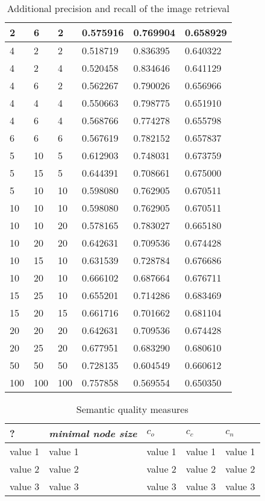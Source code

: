 \begin{table}[h]
    \begin{tabular}{| p{2cm}| p{2cm}| p{2cm} || p{2cm} | p{2cm} | p{2cm} |}
    \hline
    2	& 6	& 2	& 0.575916 & 0.769904 & 0.658929 \\ \hline    
    4	& 2	& 2	& 0.518719 & 0.836395 & 0.640322 \\ \hline	      
    4	& 2	& 4	& 0.520458 & 0.834646 & 0.641129 \\ \hline	
    4	& 6	& 2	& 0.562267 & 0.790026 & 0.656966 \\ \hline     
    4 	& 4 	& 4 & 0.550663 & 0.798775 & 0.651910 \\ \hline
 	4	& 6	& 4	& 0.568766 & 0.774278 & 0.655798 \\ \hline    
    6 	& 6 	& 6 & 0.567619 & 0.782152 & 0.657837 \\ \hline  
	5 	& 10 & 5 & 0.612903 & 0.748031 & 0.673759 \\ \hline
    5 	& 15 & 5 & 0.644391 & 0.708661 & 0.675000 \\ \hline  
   	5 	& 10 & 10 & 0.598080 & 0.762905 & 0.670511 \\ \hline 
    10 	& 10 & 10 & 0.598080 & 0.762905 & 0.670511 \\ \hline 
    10 	& 10 & 20 & 0.578165 & 0.783027 & 0.665180 \\ \hline    
    10 	& 20 & 20 & 0.642631 & 0.709536 & 0.674428 \\ \hline
    10 	& 15 & 10 & 0.631539 & 0.728784 & 0.676686 \\ \hline  
    10 	& 20 & 10 & 0.666102 & 0.687664 & 0.676711 \\ \hline
    15 	& 25 & 10 & 0.655201 & 0.714286 & 0.683469 \\ \hline
    15 	& 20 & 15 & 0.661716 & 0.701662 & 0.681104 \\ \hline    
    20 	& 20 & 20 & 0.642631 & 0.709536 & 0.674428 \\ \hline
    20 	& 25 & 20 & 0.677951 & 0.683290 & 0.680610 \\ \hline  
    50	& 50 & 50 & 0.728135 & 0.604549 & 0.660612 \\ \hline
    100 	& 100 & 100 & 0.757858 & 0.569554 & 0.650350 \\ \hline
    \end{tabular}
    \caption{Additional precision and recall of the image retrieval}
\end{table}


\begin{table}[h]
    \begin{tabular}{| p{1.8cm} | p{1.8cm} || p{1.5cm} | p{1.5cm} | p{1.5cm} |}
    \hline
    ?	& \emph{minimal node size} & $c_o $ & $c_c$ & $c_n$ \\ \hline
    value 1 		& value 1 	& value 1 	& value 1	& value 1 \\ \hline
    value 2 		& value 2	& value 2 	& value 2	& value 2 \\ \hline
    value 3	 	& value 3	& value 3 	& value 3	& value 3 \\
    \hline
    \end{tabular}
    \caption{Semantic quality measures}
	\label{tab_treeevaluation}
\end{table}

